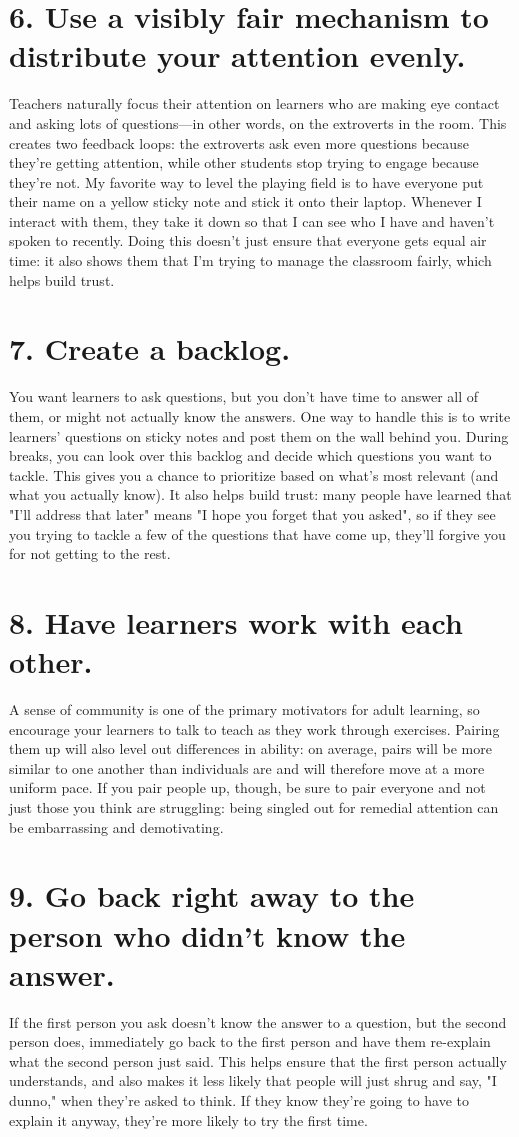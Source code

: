 \documentclass[10pt,letterpaper]{article}
\newcommand{\rulemajor}[1]{\section{#1}}
\begin{document}
\rulemajor{6. Use a visibly fair mechanism to distribute your attention evenly.}

Teachers naturally focus their attention on learners who are making eye contact and asking lots of questions---in other words,
on the extroverts in the room.
This creates two feedback loops:
the extroverts ask even more questions because they're getting attention,
while other students stop trying to engage because they're not.
My favorite way to level the playing field is to have everyone put their name on a yellow sticky note
and stick it onto their laptop.
Whenever I interact with them, they take it down
so that I can see who I have and haven't spoken to recently.
Doing this doesn't just ensure that everyone gets equal air time:
it also shows them that I'm trying to manage the classroom fairly,
which helps build trust.

\rulemajor{7. Create a backlog.}

You want learners to ask questions, but you don't have time to answer all of them,
or might not actually know the answers.
One way to handle this is to write learners' questions on sticky notes and post them on the wall behind you.
During breaks,
you can look over this backlog and decide which questions you want to tackle.
This gives you a chance to prioritize based on what's most relevant (and what you actually know).
It also helps build trust:
many people have learned that "I'll address that later" means "I hope you forget that you asked",
so if they see you trying to tackle a few of the questions that have come up,
they'll forgive you for not getting to the rest.

\rulemajor{8. Have learners work with each other.}

A sense of community is one of the primary motivators for adult learning,
so encourage your learners to talk to teach as they work through exercises.
Pairing them up will also level out differences in ability:
on average, pairs will be more similar to one another than individuals are
and will therefore move at a more uniform pace.
If you pair people up, though, be sure to pair everyone and not just those you think are struggling:
being singled out for remedial attention can be embarrassing and demotivating.

\rulemajor{9. Go back right away to the person who didn't know the answer.}

If the first person you ask doesn't know the answer to a question,
but the second person does,
immediately go back to the first person and have them re-explain
what the second person just said.
This helps ensure that the first person actually understands,
and also makes it less likely that people will just shrug and say, "I dunno," when they're asked to think.
If they know they're going to have to explain it anyway,
they're more likely to try the first time.
\end{document}
